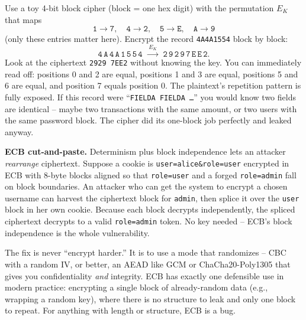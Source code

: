 \begin{example}
\label{ch38:ex-ecb}
Use a toy 4-bit block cipher (block = one hex digit) with the permutation $E_K$ that maps
\[
\texttt{1}\!\to\!\texttt{7},\quad \texttt{4}\!\to\!\texttt{2},\quad \texttt{5}\!\to\!\texttt{E},\quad \texttt{A}\!\to\!\texttt{9}
\]
(only these entries matter here). Encrypt the record \texttt{4A4A1554} block by block:
\[
\texttt{4}\,\texttt{A}\,\texttt{4}\,\texttt{A}\,\texttt{1}\,\texttt{5}\,\texttt{5}\,\texttt{4}
\;\xrightarrow{\;E_K\;}\;
\texttt{2}\,\texttt{9}\,\texttt{2}\,\texttt{9}\,\texttt{7}\,\texttt{E}\,\texttt{E}\,\texttt{2}.
\]
Look at the ciphertext \texttt{2929 7EE2} without knowing the key. You can immediately read off: positions 0 and 2 are equal, positions 1 and 3 are equal, positions 5 and 6 are equal, and position 7 equals position 0. The plaintext's repetition pattern is fully exposed. If this record were ``\texttt{FIELDA FIELDA \dots}'' you would know two fields are identical -- maybe two transactions with the same amount, or two users with the same password block. The cipher did its one-block job perfectly and leaked anyway.
\end{example}

\begin{attackbox}
\textbf{ECB cut-and-paste.} Determinism plus block independence lets an attacker \emph{rearrange} ciphertext. Suppose a cookie is \texttt{user=alice\&role=user} encrypted in ECB with 8-byte blocks aligned so that \texttt{role=user} and a forged \texttt{role=admin} fall on block boundaries. An attacker who can get the system to encrypt a chosen username can harvest the ciphertext block for \texttt{admin}, then splice it over the \texttt{user} block in her own cookie. Because each block decrypts independently, the spliced ciphertext decrypts to a valid \texttt{role=admin} token. No key needed -- ECB's block independence is the whole vulnerability.
\end{attackbox}

\begin{focusbox}
The fix is never ``encrypt harder.'' It is to use a mode that randomizes -- CBC with a random IV, or better, an AEAD like GCM or ChaCha20-Poly1305 that gives you confidentiality \emph{and} integrity. ECB has exactly one defensible use in modern practice: encrypting a single block of already-random data (e.g., wrapping a random key), where there is no structure to leak and only one block to repeat. For anything with length or structure, ECB is a bug.
\end{focusbox}

